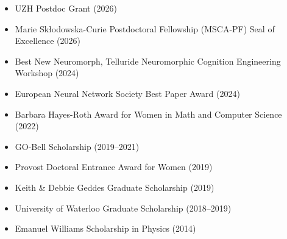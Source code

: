 \documentclass[11pt,a4paper,ragged2e,academicons]{altacv}
\begin{document}
\begin{fullwidth}

\noindent
\begin{itemize}
\item UZH Postdoc Grant (2026)
\item Marie Skłodowska-Curie Postdoctoral Fellowship (MSCA-PF) Seal of Excellence (2026)
    \item Best New Neuromorph, Telluride Neuromorphic Cognition Engineering Workshop  (2024)
\item European Neural Network Society Best Paper Award (2024)
\item Barbara Hayes-Roth Award for Women in Math and Computer Science (2022)
\item GO-Bell Scholarship (2019–2021)
\item Provost Doctoral Entrance Award for Women (2019)
\item Keith \& Debbie Geddes Graduate Scholarship (2019)
\item University of Waterloo Graduate Scholarship (2018–2019)
\item Emanuel Williams Scholarship in Physics (2014)
\end{itemize}



\end{fullwidth}
\end{document}
